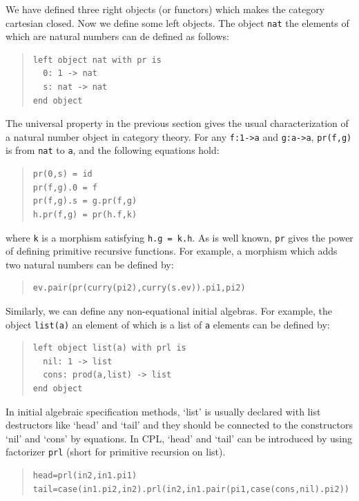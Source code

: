 We have defined three right objects (or functors) which makes the category
cartesian closed.  Now we define some left objects.  The object \verb"nat"
the elements of which are natural numbers can de defined as follows:
\begin{quote}
\begin{verbatim}
left object nat with pr is
  0: 1 -> nat
  s: nat -> nat
end object
\end{verbatim}
\end{quote}
The universal property in the previous section gives the usual
characterization of a natural number object in category theory.  For any
 \verb"f:1->a" and \verb"g:a->a", \verb"pr(f,g)" is from \verb"nat" to
 \verb"a", and the following equations hold:
\begin{quote}
\begin{verbatim}
pr(0,s) = id
pr(f,g).0 = f
pr(f,g).s = g.pr(f,g)
h.pr(f,g) = pr(h.f,k)
\end{verbatim}
\end{quote}
where \verb"k" is a morphism satisfying \verb"h.g = k.h".  As is well known,
\verb"pr" gives the power of defining primitive recursive functions.  For
example, a morphism which adds two natural numbers can be defined by:
\begin{quote}
\begin{verbatim}
ev.pair(pr(curry(pi2),curry(s.ev)).pi1,pi2)
\end{verbatim}
\end{quote}

Similarly, we can define any non-equational initial algebras.  For example,
the object \verb"list(a)" an element of which is a list of \verb"a" elements
can be defined by:
\begin{quote}
\begin{verbatim}
left object list(a) with prl is
  nil: 1 -> list
  cons: prod(a,list) -> list
end object
\end{verbatim}
\end{quote}
In initial algebraic specification methods, `list' is usually declared with
list destructors like `head' and `tail' and they should be connected to the
constructors `nil' and `cons' by equations.  In CPL, `head' and `tail' can
be introduced by using factorizer \verb"prl" (short for primitive recursion
on list).
\begin{quote}
\begin{verbatim}
head=prl(in2,in1.pi1)
tail=case(in1.pi2,in2).prl(in2,in1.pair(pi1,case(cons,nil).pi2))
\end{verbatim}
\end{quote}

